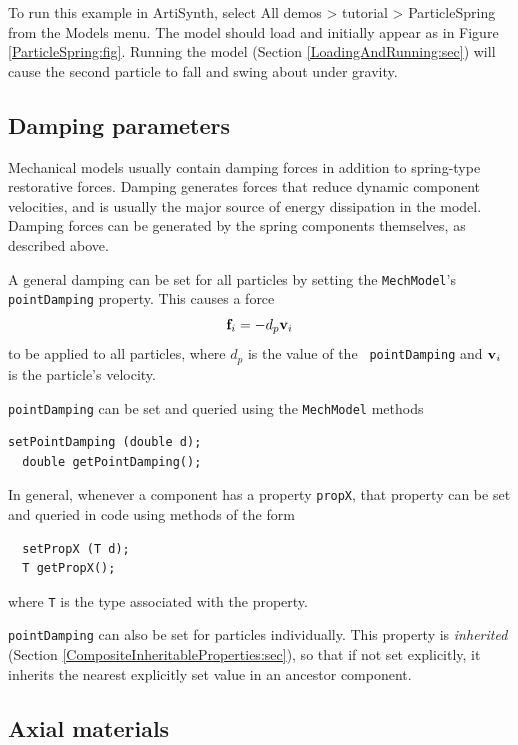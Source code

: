 To run this example in ArtiSynth, select {\sf All demos > tutorial >
ParticleSpring} from the {\sf Models} menu. The model should load and
initially appear as in Figure \ref{ParticleSpring:fig}.  Running
the model (Section \ref{LoadingAndRunning:sec}) will
cause the second particle to fall and swing about under gravity.

\subsection{Damping parameters}
\label{BodyDamping:sec}

Mechanical models usually contain damping forces in addition to
spring-type restorative forces. Damping generates forces that reduce
dynamic component velocities, and is usually the major source of
energy dissipation in the model. Damping forces can be generated by
the spring components themselves, as described above.

A general damping can be set for all particles by setting the
{\tt MechModel}'s {\tt pointDamping} property. This causes
a force
%
\begin{equation}
{\bf f}_i = -d_p {\bf v}_i \label{eqn:pointdamping}
\end{equation}
%
to be applied to all particles, where $d_p$ is the value of the {\tt
pointDamping} and ${\bf v}_i$ is the particle's velocity.

{\tt pointDamping} can be set and queried using the {\tt MechModel}
methods
\begin{lstlisting}[]
  setPointDamping (double d);
  double getPointDamping();
\end{lstlisting}
%

\begin{sideblock}
In general, whenever a component has a property {\tt propX}, that
property can be set and queried in code using methods of the form
\begin{verbatim}
  setPropX (T d);
  T getPropX();
\end{verbatim}
where {\tt T} is the type associated with the property.
\end{sideblock}

{\tt pointDamping} can also be set for particles individually.  This
property is {\it inherited} (Section
\ref{CompositeInheritableProperties:sec}), so that if not set
explicitly, it inherits the nearest explicitly set value in an
ancestor component.


\subsection{Axial materials}
\label{AxialMaterials:sec}

